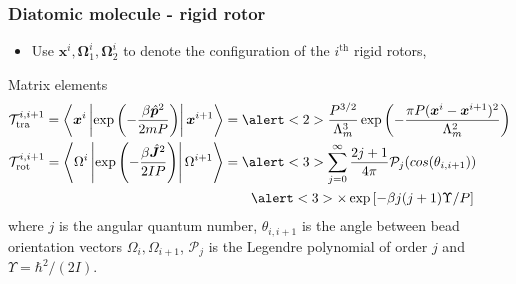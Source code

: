 \documentclass[xcolor=svgnames]{beamer}
\DeclareRobustCommand{\mc}[1]{\mathcal{#1}}
\DeclareRobustCommand{\mbf}[1]{{\boldsymbol {#1}}}
\begin{document}
        \begin{frame}
            \frametitle{Diatomic molecule - rigid rotor}
            \begin{itemize}
                \item Use $\mbf{x}^i, \mbf{\Omega}_1^i, \mbf{\Omega}_2^i$ to denote the configuration of the $i^\text{th}$ rigid rotors,
            \end{itemize}
            \begin{block}{Matrix elements}
                \begin{equation*}
                    \begin{aligned}
                        \mc{T}^{i,i+1}_{\text{tra}} = \left< \mbf{x}^i \left| \exp \left(-\displaystyle\frac{\beta \hat{\mbf{p}}^2}{2 m P} \right) \right| \mbf{x}^{i+1} \right> &= \alert<2>{\displaystyle\frac{P^{3/2}}{\Lambda_m^3} \exp \left(-\displaystyle\frac{\pi P (\mbf{x}^i - \mbf{x}^{i+1})^2}{\Lambda_m^2}\right)}\\
                        \mc{T}^{i,i+1}_{\text{rot}} = \left< \Omega^i \left| \exp \left(-\displaystyle\frac{\beta \hat{\mbf{J}}^2}{2IP} \right) \right| \Omega^{i+1} \right> &= \alert<3>{\displaystyle\sum_{j=0}^\infty \frac{2j+1}{4 \pi} \mc{P}_j (cos (\theta_{i,i+1}))}\\
                        &\qquad \alert<3>{\times \exp \left[-\beta j(j+1) \Upsilon/ P \right]}
                    \end{aligned}
                \end{equation*}
                where $j$ is the angular quantum number, $\theta_{i,i+1}$ is the angle between bead orientation vectors $\Omega_i, \Omega_{i+1}$, $\mc{P}_j$ is the Legendre polynomial of order $j$ and $\Upsilon = \hbar^2/(2I)$.
            \end{block}
        \end{frame}
\end{document}
